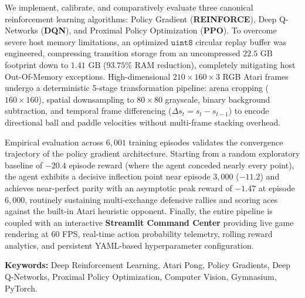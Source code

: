 \documentclass[12pt,a4paper]{report}
\begin{document}
We implement, calibrate, and comparatively evaluate three canonical reinforcement learning algorithms: Policy Gradient (\textbf{REINFORCE}), Deep Q-Networks (\textbf{DQN}), and Proximal Policy Optimization (\textbf{PPO}). To overcome severe host memory limitations, an optimized $\texttt{uint8}$ circular replay buffer was engineered, compressing transition storage from an uncompressed $22.5\text{ GB}$ footprint down to $1.41\text{ GB}$ ($93.75\%$ RAM reduction), completely mitigating host Out-Of-Memory exceptions. High-dimensional $210 \times 160 \times 3$ RGB Atari frames undergo a deterministic 5-stage transformation pipeline: arena cropping ($160 \times 160$), spatial downsampling to $80 \times 80$ grayscale, binary background subtraction, and temporal frame differencing ($\Delta s_t = s_t - s_{t-1}$) to encode directional ball and paddle velocities without multi-frame stacking overhead.

Empirical evaluation across $6,001$ training episodes validates the convergence trajectory of the policy gradient architecture. Starting from a random exploratory baseline of $-20.4$ episode reward (where the agent conceded nearly every point), the agent exhibits a decisive inflection point near episode $3,000$ ($-11.2$) and achieves near-perfect parity with an asymptotic peak reward of $-1.47$ at episode $6,000$, routinely sustaining multi-exchange defensive rallies and scoring aces against the built-in Atari heuristic opponent. Finally, the entire pipeline is coupled with an interactive \textbf{Streamlit Command Center} providing live game rendering at 60 FPS, real-time action probability telemetry, rolling reward analytics, and persistent YAML-based hyperparameter configuration.

\vspace{0.5cm}
\noindent
\textbf{Keywords:} Deep Reinforcement Learning, Atari Pong, Policy Gradients, Deep Q-Networks, Proximal Policy Optimization, Computer Vision, Gymnasium, PyTorch.

\newpage
\tableofcontents

\newpage
\listoftables

\newpage
\listoffigures

\newpage
\end{document}
